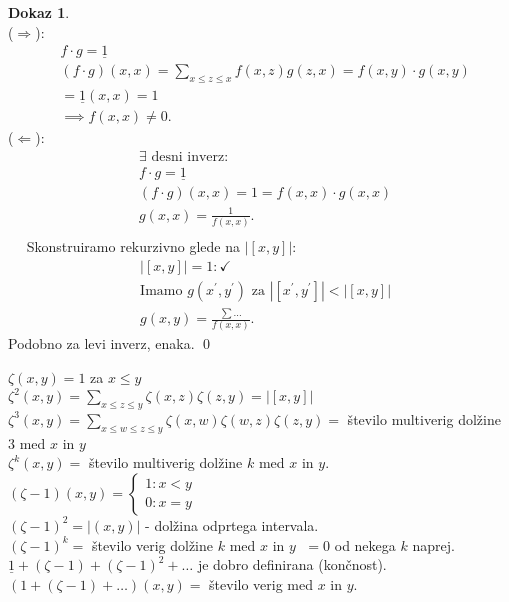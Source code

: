 \documentclass[a4paper, 12pt]{book}
\theoremstyle{definition}
\newtheorem{pro}[counter]{Dokaz}
\theoremstyle{remark}
\begin{document}
\begin{pro} \text{} \\
  ($\Rightarrow$):
  \begin{align*}
    &f \cdot g = \underline{1} \\
    &(f \cdot g)(x,x) = \sum_{x \leq z \leq x} f(x,z) g(z,x) = f(x,y) \cdot g(x,y) \\
    &= \underline{1}(x,x) = 1 \\
    &\implies f(x,x) \neq 0.
  \end{align*}
  ($\Leftarrow$):
  \begin{align*}
    &\exists \text{ desni inverz:} \\
    &f \cdot g = \underline{1} \\
    &(f \cdot g)(x,x) = 1 = f(x,x) \cdot g(x,x) \\
    &g(x,x) = \frac{1}{f(x,x)}. \\
  \end{align*}
  $\quad$ Skonstruiramo rekurzivno glede na $\left|[x,y]\right|$:
  \begin{align*}
    &|[x,y]| = 1: \checkmark \\
    &\text{Imamo } g(x^{'}, y^{'}) \text{ za } |[x^{'}, y^{'}]| < |[x,y]| \\
    &g(x,y) = \frac{\sum \dots}{f(x,x)}.
  \end{align*}
  Podobno za levi inverz, enaka.
  \qed
\end{pro}
$\zeta(x,y) = 1$ za $x \leq y$ \\
$\zeta^2(x,y) = \sum_{x \leq z \leq y} \zeta(x,z) \zeta(z,y) = \left|[x,y]\right|$ \\
$\zeta^3(x,y) = \sum_{x \leq w \leq z \leq y} \zeta(x,w) \zeta(w,z) \zeta(z,y) =$
število multiverig dolžine $3$ med $x$ in $y$ \\
$\zeta^k(x,y) =$ število multiverig dolžine $k$ med $x$ in $y$. \\
$(\zeta-1)(x,y) = \begin{cases}
  1: x < y \\
  0: x = y
\end{cases}$ \\
$(\zeta-1)^2 = \left|(x,y)\right|$ - dolžina odprtega intervala. \\
$(\zeta-1)^k =$ število verig dolžine $k$ med $x$ in $y \;$ $= 0$ od nekega $k$ naprej. \\
$\underline{1} + (\zeta-1) + (\zeta-1)^2 + \dots$ je dobro definirana (končnost). \\
$(1 + (\zeta-1) + \dots)(x,y) =$ število verig med $x$ in $y$. \\
\end{document}
